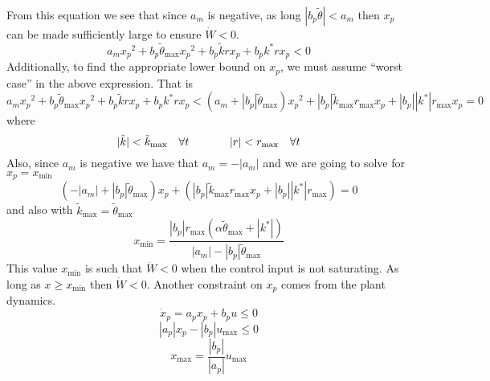 From this equation we see that since $a_{m}$ is negative, as long $|b_{p}\tilde{\theta}|<a_{m}$ then $x_{p}$ can be made sufficiently large to ensure $\dot{W}<0$.
\begin{equation*}
  a_{m}x_{p}{}^{2}+b_{p}\tilde{\theta}_{\max}x_{p}{}^{2}+b_{p}\tilde{k}rx_{p}+b_{p}k^{*}rx_{p}<0
\end{equation*}
Additionally, to find the appropriate lower bound on $x_{p}$, we must assume ``worst case''  in the above expression.
That is
\begin{equation*}
  a_{m}x_{p}{}^{2}+b_{p}\tilde{\theta}_{\max}x_{p}{}^{2}+b_{p}\tilde{k}rx_{p}+b_{p}k^{*}rx_{p}<
  (a_{m}+|b_{p}|\tilde{\theta}_{\max})x_{p}{}^{2}+|b_{p}|\tilde{k}_{\max}r_{\text{max}}x_{p}+|b_{p}||k^{*}|r_{\text{max}}x_{p}=0
\end{equation*}
where
\begin{equation*}
  |\tilde{k}|<\tilde{k}_{\max}\quad\forall t
  \hspace{0.5in}
  |r|<r_{\text{max}}\quad\forall t
\end{equation*}
Also, since $a_{m}$ is negative we have that $a_{m}=-|a_{m}|$ and we are going to solve for $x_{p}=x_{\min}$
\begin{equation*}
  (-|a_{m}|+|b_{p}|\tilde{\theta}_{\max})x_{p}{}+(|b_{p}|\tilde{k}_{\max}r_{\text{max}}x_{p}+|b_{p}||k^{*}|r_{\text{max}})=0
\end{equation*}
and also with $\tilde{k}_{\max}=\tilde{\theta}_{\max}$
\begin{equation*}
  x_{\min}=
  \frac{|b_{p}|r_{\text{max}}(\alpha\tilde{\theta}_{\max}+|k^{*}|)}{|a_{m}|-|b_{p}|\tilde{\theta}_{\max}}
\end{equation*}
This value $x_{\min}$ is such that $\dot{W}<0$ when the control input is not saturating.
As long as $x\geq x_{\min}$ then $\dot{W}<0$.
Another constraint on $x_{p}$ comes from the plant dynamics.
\begin{equation*}
  \dot{x}_{p}=a_{p}x_{p}+b_{p}u\leq0
\end{equation*}
\begin{equation*}
  |a_{p}|x_{p}-|b_{p}|u_{\text{max}}\leq0
\end{equation*}
\begin{equation*}
  x_{\max}=\frac{|b_{p}|}{|a_{p}|}u_{\text{max}}
\end{equation*}

